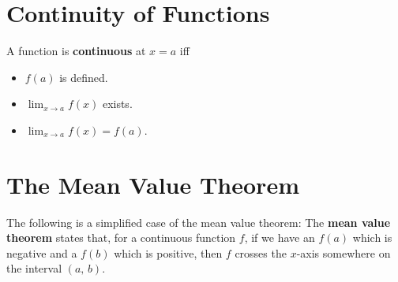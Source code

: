 \section{Continuity of Functions}
\begin{defn}
  A function is \textbf{continuous} at $x=a$ iff
  \begin{itemize}
    \item $f(a)$ is defined.
    \item $\lim_{x\to a} f(x)$ exists.
    \item $\lim_{x\to a} f(x)=f(a)$.
  \end{itemize}
\end{defn}

\section{The Mean Value Theorem}
The following is a simplified case of the mean value theorem:
The \textbf{mean value theorem} states that, for a continuous function $f$,
if we have an $f(a)$ which is negative and a $f(b)$ which is positive,
then $f$ crosses the $x$-axis somewhere on the interval $(a, \, b)$.
